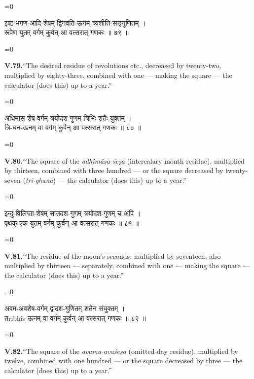 \documentclass[11pt,a4paper]{article}
\newcommand{\dev}[1]{{\devanagarifont\color{sktcolor}#1}}
\newcommand{\iast}[1]{\textit{#1}}
\newenvironment{paracol}[1]{\begingroup}{\endgroup}
\newcommand{\switchcolumn}[1][]{%
  \ifnum#1=0\relax\else\par\nobreak\vspace{0.5em}\par\nobreak\fi%
}
\begin{document}
\vspace{0.3cm}

\begin{paracol}{2}
\switchcolumn[0]
\dev{%
इष्ट-भगण-आदि-शेषम् द्विनवति-ऊनम् त्र्यशीति-सङ्गुणितम् ।\\
रूपेण युतम् वर्गम् कुर्वन् आ वत्सरात् गणकः ॥ ७९ ॥
}

\switchcolumn[1]
\textbf{V.79.}\quad ``The desired residue of revolutions etc.,
decreased by twenty-two, multiplied by eighty-three, combined with
one — making the square — the calculator (does this) up to a year.''
\end{paracol}

\vspace{0.3cm}

\begin{paracol}{2}
\switchcolumn[0]
\dev{%
अधिमास-शेष-वर्गम् त्रयोदश-गुणम् त्रिभिः शतैः युक्तम् ।\\
त्रि-घन-ऊनम् वा वर्गम् कुर्वन् आ वत्सरात् गणकः ॥ ८० ॥
}

\switchcolumn[1]
\textbf{V.80.}\quad ``The square of the \iast{adhimāsa-śeṣa}
(intercalary month residue), multiplied by thirteen, combined with
three hundred — or the square decreased by twenty-seven
(\iast{tri-ghana}) — the calculator (does this) up to a year.''
\end{paracol}

\vspace{0.3cm}

\begin{paracol}{2}
\switchcolumn[0]
\dev{%
इन्दु-विलिप्ता-शेषम् सप्तदश-गुणम् त्रयोदश-गुणम् च अपि ।\\
पृथक् एक-युतम् वर्गम् कुर्वन् आ वत्सरात् गणकः ॥ ८१ ॥
}

\switchcolumn[1]
\textbf{V.81.}\quad ``The residue of the moon's seconds, multiplied
by seventeen, also multiplied by thirteen — separately, combined
with one — making the square — the calculator (does this) up to a
year.''
\end{paracol}

\vspace{0.3cm}

\begin{paracol}{2}
\switchcolumn[0]
\dev{%
अवम-अवशेष-वर्गम् द्वादश-गुणितम् शतेन संयुक्तम् ।\\
तribhis ऊनम् वा वर्गम् कुर्वन् आ वत्सरात् गणकः ॥ ८२ ॥
}

\switchcolumn[1]
\textbf{V.82.}\quad ``The square of the \iast{avama-avaśeṣa}
(omitted-day residue), multiplied by twelve, combined with one
hundred — or the square decreased by three — the calculator (does
this) up to a year.''
\end{paracol}
\end{document}
